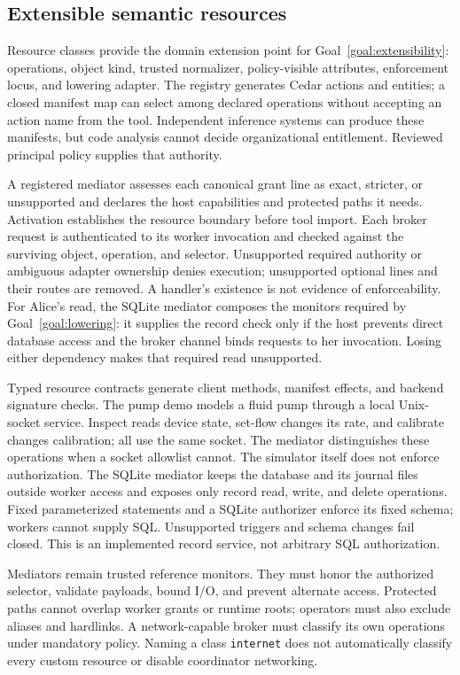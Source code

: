 \documentclass[letterpaper,twocolumn,10pt]{article}
\newcommand{\code}[1]{\texttt{#1}}
\begin{document}
\subsection{Extensible semantic resources}
\label{sec:resources}

Resource classes provide the domain extension point for
Goal~\ref{goal:extensibility}: operations, object kind, trusted normalizer,
policy-visible attributes, enforcement locus, and lowering adapter. The registry
generates Cedar actions and entities; a closed manifest map can select among
declared operations without accepting an action name from the tool. Independent
inference systems can produce these manifests, but code analysis cannot decide
organizational entitlement. Reviewed principal policy supplies that authority.

A registered mediator assesses each canonical grant line as exact, stricter, or
unsupported and declares the host capabilities and protected paths it needs.
Activation establishes the resource boundary before tool import. Each broker
request is authenticated to its worker invocation and checked against the
surviving object, operation, and selector. Unsupported required authority or
ambiguous adapter ownership denies execution; unsupported optional lines and
their routes are removed. A handler's existence is not evidence of enforceability. For Alice's read,
the SQLite mediator composes the monitors required by Goal~\ref{goal:lowering}:
it supplies the record check only if the host prevents direct
database access and the broker channel binds requests to her invocation. Losing
either dependency makes that required read unsupported.

Typed resource contracts generate client methods, manifest effects, and backend
signature checks. The pump demo models a fluid pump through a local Unix-socket service. Inspect
reads device state, set-flow changes its rate, and calibrate changes calibration;
all use the same socket. The mediator distinguishes these operations when a
socket allowlist cannot. The simulator itself does not enforce authorization.
The SQLite mediator keeps the database and its journal files outside worker
access and exposes only record read, write, and delete operations. Fixed
parameterized statements and a SQLite authorizer enforce its fixed schema;
workers cannot supply SQL. Unsupported triggers and schema changes fail closed.
This is an implemented record service, not arbitrary SQL authorization.

Mediators remain trusted reference monitors. They must honor the authorized
selector, validate payloads, bound I/O, and prevent alternate access. Protected
paths cannot overlap worker grants or runtime roots; operators must also exclude
aliases and hardlinks. A network-capable broker must classify its own operations
under mandatory policy. Naming a class \code{internet} does not automatically
classify every custom resource or disable coordinator networking.
\end{document}
